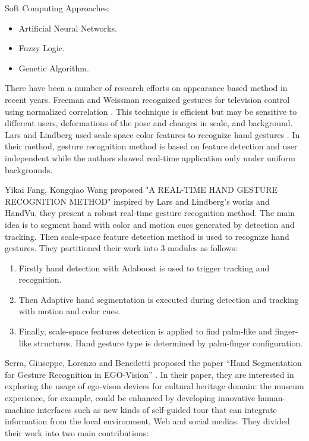 \bigskip
Soft Computing Approaches:
\begin{itemize}
\item Artificial Neural Networks.
\item Fuzzy Logic.
\item Genetic Algorithm.
\end{itemize}

\bigskip



There have been a number of research efforts on appearance based method in recent years. Freeman and Weissman recognized gestures for television control using normalized correlation \cite{relatedsg3}. This technique is efficient but may be sensitive to different users, deformations of the pose and changes in scale, and background. Lars and Lindberg used scale-space color features to recognize hand gestures \cite{relatedsg4}. In their method, gesture recognition method is based on feature detection and user independent while the authors showed real-time application only under uniform backgrounds.
\bigskip

Yikai Fang, Kongqiao Wang proposed "A REAL-TIME HAND GESTURE RECOGNITION METHOD" \cite{relatedsg5} inspired by Lars and Lindberg’s works and HandVu, they present a robust real-time gesture recognition method. The main idea is to segment hand with color and motion cues generated by detection and tracking. Then scale-space feature detection method is used to recognize hand gestures. They partitioned their work into 3 modules as follows:\bigskip
\begin{enumerate}
\item  Firstly hand detection with Adaboost is used to trigger tracking and recognition.
\item Then Adaptive hand segmentation is executed during detection and tracking with motion and color cues.
\item  Finally, scale-space features detection is applied to find palm-like and finger-like structures. Hand gesture type is determined by palm-finger configuration.
\end{enumerate}
\bigskip

Serra, Giuseppe, Lorenzo and Benedetti proposed the paper “Hand Segmentation for Gesture Recognition in EGO-Vision” \cite{relatedsg6}. In their paper, they are interested in exploring the usage of ego-vison devices for cultural heritage domain: the museum experience, for example, could be enhanced by developing innovative human-machine interfaces such as new kinds of self-guided tour that can integrate information from the local environment, Web and social medias.
They divided their work into two main contributions:
\bigskip

